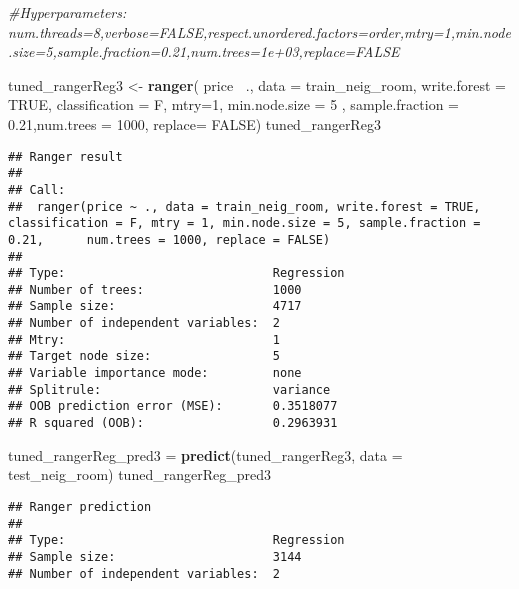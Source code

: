 \documentclass[
]{article}
\newenvironment{Shaded}{\begin{snugshade}}{\end{snugshade}}
\newcommand{\CommentTok}[1]{\textcolor[rgb]{0.56,0.35,0.01}{\textit{#1}}}
\newcommand{\DataTypeTok}[1]{\textcolor[rgb]{0.13,0.29,0.53}{#1}}
\newcommand{\DecValTok}[1]{\textcolor[rgb]{0.00,0.00,0.81}{#1}}
\newcommand{\FloatTok}[1]{\textcolor[rgb]{0.00,0.00,0.81}{#1}}
\newcommand{\KeywordTok}[1]{\textcolor[rgb]{0.13,0.29,0.53}{\textbf{#1}}}
\newcommand{\NormalTok}[1]{#1}
\newcommand{\OperatorTok}[1]{\textcolor[rgb]{0.81,0.36,0.00}{\textbf{#1}}}
\newcommand{\OtherTok}[1]{\textcolor[rgb]{0.56,0.35,0.01}{#1}}
\newcommand{\StringTok}[1]{\textcolor[rgb]{0.31,0.60,0.02}{#1}}
\begin{document}
\begin{Shaded}
\begin{Highlighting}[]
\CommentTok{#Hyperparameters: num.threads=8,verbose=FALSE,respect.unordered.factors=order,mtry=1,min.node.size=5,sample.fraction=0.21,num.trees=1e+03,replace=FALSE}

\NormalTok{tuned_rangerReg3 <-}\StringTok{ }\KeywordTok{ranger}\NormalTok{( price}\OperatorTok{~}\StringTok{ }\NormalTok{., }\DataTypeTok{data =}\NormalTok{ train_neig_room, }\DataTypeTok{write.forest =} \OtherTok{TRUE}\NormalTok{, }\DataTypeTok{classification =}\NormalTok{ F, }\DataTypeTok{mtry=}\DecValTok{1}\NormalTok{, }
                           \DataTypeTok{min.node.size =} \DecValTok{5}\NormalTok{    , }\DataTypeTok{sample.fraction =} \FloatTok{0.21}\NormalTok{,}\DataTypeTok{num.trees =} \DecValTok{1000}\NormalTok{, }\DataTypeTok{replace=} \OtherTok{FALSE}\NormalTok{)}
\NormalTok{tuned_rangerReg3}
\end{Highlighting}
\end{Shaded}

\begin{verbatim}
## Ranger result
## 
## Call:
##  ranger(price ~ ., data = train_neig_room, write.forest = TRUE,      classification = F, mtry = 1, min.node.size = 5, sample.fraction = 0.21,      num.trees = 1000, replace = FALSE) 
## 
## Type:                             Regression 
## Number of trees:                  1000 
## Sample size:                      4717 
## Number of independent variables:  2 
## Mtry:                             1 
## Target node size:                 5 
## Variable importance mode:         none 
## Splitrule:                        variance 
## OOB prediction error (MSE):       0.3518077 
## R squared (OOB):                  0.2963931
\end{verbatim}

\begin{Shaded}
\begin{Highlighting}[]
\NormalTok{tuned_rangerReg_pred3 =}\StringTok{ }\KeywordTok{predict}\NormalTok{(tuned_rangerReg3, }\DataTypeTok{data =}\NormalTok{ test_neig_room)}
\NormalTok{tuned_rangerReg_pred3}
\end{Highlighting}
\end{Shaded}

\begin{verbatim}
## Ranger prediction
## 
## Type:                             Regression 
## Sample size:                      3144 
## Number of independent variables:  2
\end{verbatim}
\end{document}
